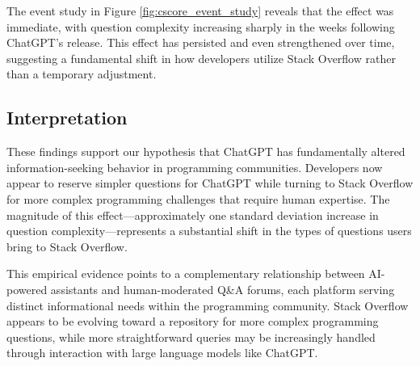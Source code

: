 The event study in Figure \ref{fig:cscore_event_study} reveals that the effect was immediate, with question complexity increasing sharply in the weeks following ChatGPT's release. This effect has persisted and even strengthened over time, suggesting a fundamental shift in how developers utilize Stack Overflow rather than a temporary adjustment.

\subsection{Interpretation}

These findings support our hypothesis that ChatGPT has fundamentally altered information-seeking behavior in programming communities. Developers now appear to reserve simpler questions for ChatGPT while turning to Stack Overflow for more complex programming challenges that require human expertise. The magnitude of this effect—approximately one standard deviation increase in question complexity—represents a substantial shift in the types of questions users bring to Stack Overflow.

This empirical evidence points to a complementary relationship between AI-powered assistants and human-moderated Q\&A forums, each platform serving distinct informational needs within the programming community. Stack Overflow appears to be evolving toward a repository for more complex programming questions, while more straightforward queries may be increasingly handled through interaction with large language models like ChatGPT.